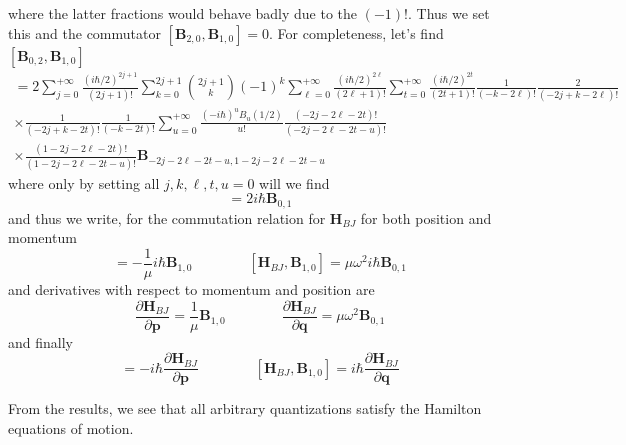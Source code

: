 \documentclass[a4paper]{article}
\theoremstyle{definition}
\begin{document}
where the latter fractions would behave badly due to the $(-1)!$. Thus we set this and the commutator $[\textbf{B}_{2,0},\textbf{B}_{1,0}]=0$. For completeness, let's find $[\textbf{B}_{0,2},\textbf{B}_{1,0}]$
\begin{multline}
	[\textbf{B}_{0,2},\textbf{B}_{1,0}]=2\sum_{j=0}^{+\infty}\frac{(i\hbar/2)^{2j+1}}{(2j+1)!}\sum_{k=0}^{2j+1}\binom{2j+1}{k}(-1)^k\sum_{\ell=0}^{+\infty}\frac{(i\hbar/2)^{2\ell}}{(2\ell+1)!}\sum_{t=0}^{+\infty}\frac{(i\hbar/2)^{2t}}{(2t+1)!}\frac{1}{(-k-2\ell)!}\frac{2}{(-2j+k-2\ell)!}\\\times\frac{1}{(-2j+k-2t)!}\frac{1}{(-k-2t)!}\sum_{u=0}^{+\infty}\frac{(-i\hbar)^uB_u(1/2)}{u!}\frac{(-2j-2\ell-2t)!}{(-2j-2\ell-2t-u)!}\\\times\frac{(1-2j-2\ell-2t)!}{(1-2j-2\ell-2t-u)!}\textbf{B}_{-2j-2\ell-2t-u,1-2j-2\ell-2t-u}
\end{multline}
where only by setting all $j,k,\ell,t,u=0$ will we find
\begin{equation}
	[\textbf{B}_{0,2},\textbf{B}_{1,0}]=2i\hbar\textbf{B}_{0,1}
\end{equation}
and thus we write, for the commutation relation for $\textbf{H}_{BJ}$ for both position and momentum
\begin{equation}
	[\textbf{H}_{BJ},\textbf{B}_{0,1}]=-\frac{1}{\mu}i\hbar\textbf{B}_{1,0}\qquad\qquad[\textbf{H}_{BJ},\textbf{B}_{1,0}]=\mu\omega^2i\hbar\textbf{B}_{0,1}
\end{equation}
and derivatives with respect to momentum and position are
\begin{equation}
	\frac{\partial\textbf{H}_{BJ}}{\partial\textbf{p}}=\frac{1}{\mu}\textbf{B}_{1,0}\qquad\qquad\frac{\partial\textbf{H}_{BJ}}{\partial\textbf{q}}=\mu\omega^2\textbf{B}_{0,1}
\end{equation}
and finally
\begin{equation}
	[\textbf{H}_{BJ},\textbf{B}_{0,1}]=-i\hbar\frac{\partial\textbf{H}_{BJ}}{\partial\textbf{p}}\qquad\qquad[\textbf{H}_{BJ},\textbf{B}_{1,0}]=i\hbar\frac{\partial\textbf{H}_{BJ}}{\partial\textbf{q}}
\end{equation}

From the results, we see that all arbitrary quantizations satisfy the Hamilton equations of motion.
\end{document}
